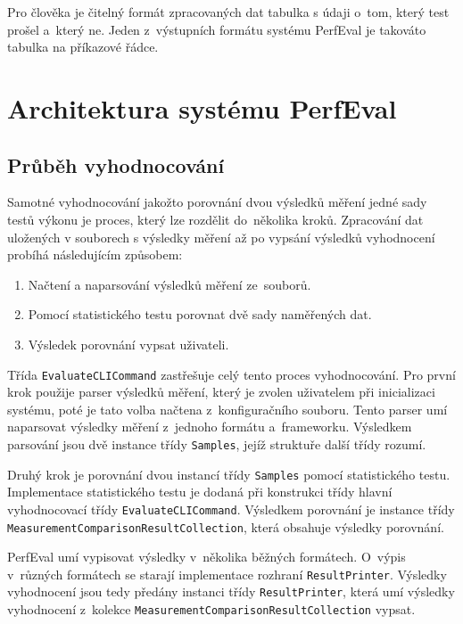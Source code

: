 Pro člověka je čitelný formát zpracovaných dat tabulka s údaji o~tom, který test prošel a~který ne.
Jeden z~výstupních formátu systému PerfEval je takováto tabulka na příkazové řádce.

\section{Architektura systému PerfEval}

\subsection{Průběh vyhodnocování}

Samotné vyhodnocování jakožto porovnání dvou výsledků měření jedné sady testů výkonu je proces, který lze rozdělit do~několika kroků.
Zpracování dat uložených v souborech s výsledky měření až po vypsání výsledků vyhodnocení probíhá následujícím způsobem:

\begin{enumerate}
    \item Načtení a naparsování výsledků měření ze~souborů.
    \item Pomocí statistického testu porovnat dvě sady naměřených dat.
    \item Výsledek porovnání vypsat uživateli.
\end{enumerate}

Třída \lstinline|EvaluateCLICommand| zastřešuje celý tento proces vyhodnocování.
Pro první krok použije parser výsledků měření, který je zvolen uživatelem při inicializaci systému,
poté je tato volba načtena z~konfiguračního souboru. Tento parser umí naparsovat výsledky měření
z~jednoho formátu a~frameworku. Výsledkem parsování jsou dvě instance třídy \lstinline|Samples|,
jejíž struktuře další třídy rozumí.

Druhý krok je porovnání dvou instancí třídy \lstinline|Samples| pomocí statistického testu.
Implementace statistického testu je dodaná při konstrukci třídy hlavní vyhodnocovací třídy \lstinline|EvaluateCLICommand|.
Výsledkem porovnání je instance třídy \lstinline|MeasurementComparisonResultCollection|, která obsahuje výsledky porovnání.

PerfEval umí vypisovat výsledky v~několika běžných formátech. O~výpis v~různých formátech se starají implementace rozhraní
\lstinline|ResultPrinter|. Výsledky vyhodnocení jsou tedy předány instanci třídy \lstinline|ResultPrinter|, která
umí výsledky vyhodnocení z~kolekce \lstinline|MeasurementComparisonResultCollection| vypsat.

